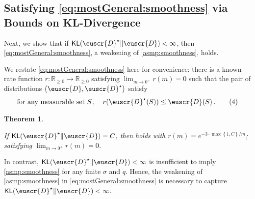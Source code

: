 \documentclass[11pt]{article}
\makeatletter
\theoremstyle{plain}
\newtheorem{theorem}{Theorem}[section]
\theoremstyle{definition}
\theoremstyle{remark}
\renewcommand{\eqref}[1]{\textup{\eqrefform@{\ref{#1}}}}
\let\eqrefform@\tagform@
\newcommand{\sinparen}[1]{(#1)}
\newcommand{\inbrace}[1]{\left\{#1\right\}}
\newcommand{\inparen}[1]{\left(#1\right)}
\newcommand{\R}{\mathbb{R}}
\newcommand{\kl}[2]{\operatornamewithlimits{\mathsf{KL}}\sinparen{#1\|#2}}
\newcommand{\sfrac}[2]{{#1/#2}}
\newcommand{\customcal}[1]{\euscr{#1}}
\newcommand{\cD}{\customcal{D}}
\newcommand{\cDtrue}{\cD^\star}
\makeatother
\begin{document}
    
            
        
    

    \subsection{Satisfying \cref{eq:mostGeneral:smoothness} via Bounds on KL-Divergence}
        \label{sec:klBoundsSatisfyGeneralSmoothness}
        Next, we show that if $\kl{\cDtrue}{\cD}<\infty$, then \cref{eq:mostGeneral:smoothness}, a weakening of \cref{asmp:smoothness}, holds.

        We restate \cref{eq:mostGeneral:smoothness} here  for convenience:
            there is a known rate function $r\colon \R_{\geq 0}\to \R_{\geq 0}$ satisfying $\lim_{m\to 0^+} r(m)=0$ such that the pair of distributions $\inparen{\cD, \cDtrue}$ satisfy
            \[
                \text{for any measurable set $S$}\,,\quad 
                r(\cDtrue(S))\leq \cD(S)\,.
                \tag{4}
            \] 
        \vspace{-5mm}
        \begin{theorem}\label{thm:capturingKL}
            
            If $\kl{\cDtrue}{\cD} = C$, then \eqref{eq:mostGeneral:smoothness} holds with $r(m)=e^{\sfrac{-3\cdot \max\inbrace{1, C}}{m}}$; satisfying \mbox{$\lim_{m\to 0^+}r(m)=0$.}
        \end{theorem}
        In contrast, $\kl{\cDtrue}{\cD}<\infty$ is insufficient to imply \cref{asmp:smoothness} for any finite $\sigma$ and $q$.
        Hence, the weakening of \cref{asmp:smoothness} in \cref{eq:mostGeneral:smoothness} is necessary to capture $\kl{\cDtrue}{\cD}<\infty$.
\end{document}
